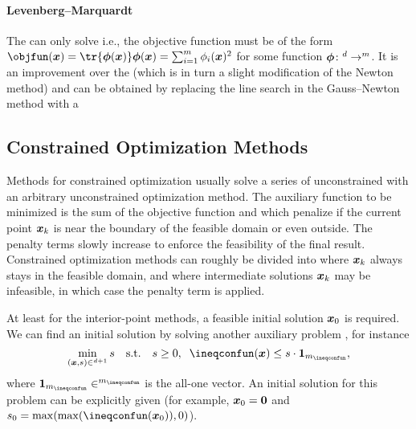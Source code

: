 \paragraph{Levenberg--Marquardt}

The 
can only solve  i.e.,
the objective function must be of the form
$\objfun(\*x) = \tr{\*\phi(\*x)} \*\phi(\*x) = \sum_{i=1}^m \phi_i(\*x)^2$
for some function $\*\phi\colon \real^d \to \real^m$.
It is an improvement over the 
(which is in turn a slight modification of the Newton method)
and can be obtained by replacing the line search in the
Gauss--Newton method with a 



\subsection{Constrained Optimization Methods}
\label{sec:513gradientBasedConstrained}

Methods for constrained optimization usually
solve a series of unconstrained  with an arbitrary
unconstrained optimization method.
The auxiliary function to be minimized is
the sum of the objective function and 
which penalize if the current point ${\boldsymbol{x}}_k$ is near the boundary
of the feasible domain or even outside.
The penalty terms slowly increase to enforce
the feasibility of the final result.
Constrained optimization methods can roughly be divided
into 
where ${\boldsymbol{x}}_k$ always stays in the feasible domain,
and 
where intermediate solutions ${\boldsymbol{x}}_k$ may be infeasible,
in which case the penalty term is applied.

At least for the interior-point methods,
a feasible initial solution ${\boldsymbol{x}}_0$ is required.
We can find an initial solution by solving another auxiliary problem
\cite{Toussaint15Introduction}, for instance
\begin{equation}
  \min_{(\*x, s) \in \real^{d+1}} s
  \quad\text{s.t.}\quad
  s \ge 0,\;\;
  \ineqconfun(\*x) \le s \cdot \*1_{m_{\ineqconfun}},
\end{equation}
where $\*1_{m_{\ineqconfun}} \in \real^{m_{\ineqconfun}}$
is the all-one vector.
An initial solution for this problem can be explicitly given
(for example, ${\boldsymbol{x}}_0 = {\boldsymbol{0}}$ and
$s_0 = \max(\max(\ineqconfun(\*x_0)), 0)$).


